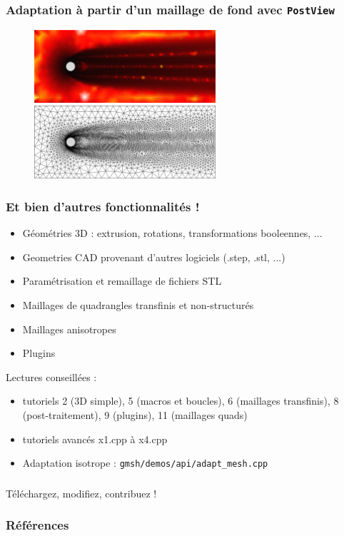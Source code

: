 \documentclass[aspectratio=169]{beamer}
\begin{document}
\begin{frame}[fragile]
\frametitle{Adaptation à partir d'un maillage de fond avec \texttt{PostView}}
\begin{figure}
  \includegraphics[width=0.6\textwidth]{figures/sizefield.png}

  \vspace{0.3cm}

  \includegraphics[width=0.6\textwidth]{figures/adapted.png}
  \caption{}
\end{figure}
\end{frame}

\begin{frame}[fragile]
\frametitle{Et bien d'autres fonctionnalités !}
\begin{itemize}
  \item Géométries 3D : extrusion, rotations, transformations booleennes, ...
  \item Geometries CAD provenant d'autres logiciels (.step, .stl, ...)
  \item Paramétrisation et remaillage de fichiers STL
  \item Maillages de quadrangles transfinis et non-structurés
  \item Maillages anisotropes
  \item Plugins
\end{itemize}
Lectures conseillées :
\begin{itemize}
  \item tutoriels 2 (3D simple), 5 (macros et boucles), 6 (maillages transfinis), 8 (post-traitement), 9 (plugins), 11 (maillages quads)
  \item tutoriels avancés x1.cpp à x4.cpp
  \item Adaptation isotrope : \texttt{gmsh/demos/api/adapt\_mesh.cpp}
\end{itemize}
\end{frame}

\begin{frame}[fragile]
\frametitle{}
Téléchargez, modifiez, contribuez !
\end{frame}

\begin{frame}[fragile]
\frametitle{Références}

\end{frame}
\end{document}
